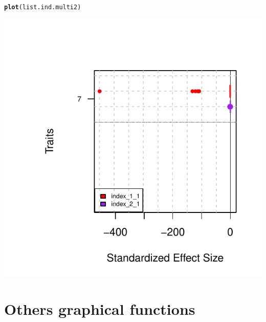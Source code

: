\documentclass[12pt]{article}\usepackage[]{graphicx}\usepackage[]{color}
\makeatletter
\def\maxwidth{ %
  \ifdim\Gin@nat@width>\linewidth
    \linewidth
  \else
    \Gin@nat@width
  \fi
}
\newcommand{\hlstd}[1]{\textcolor[rgb]{0.345,0.345,0.345}{#1}}%
\newcommand{\hlkwd}[1]{\textcolor[rgb]{0.737,0.353,0.396}{\textbf{#1}}}%
\newenvironment{kframe}{%
 \def\at@end@of@kframe{}%
 \ifinner\ifhmode%
  \def\at@end@of@kframe{\end{minipage}}%
  \begin{minipage}{\columnwidth}%
 \fi\fi%
 \def\FrameCommand##1{\hskip\@totalleftmargin \hskip-\fboxsep
 \colorbox{shadecolor}{##1}\hskip-\fboxsep
     \hskip-\linewidth \hskip-\@totalleftmargin \hskip\columnwidth}%
 \MakeFramed {\advance\hsize-\width
   \@totalleftmargin\z@ \linewidth\hsize
   \@setminipage}}%
 {\par\unskip\endMakeFramed%
 \at@end@of@kframe}
\newenvironment{knitrout}{}{} %
\makeatother
\begin{document}
\begin{knitrout}
\color{fgcolor}\begin{kframe}
\begin{alltt}
\hlkwd{plot}\hlstd{(list.ind.multi2)}
\end{alltt}
\end{kframe}
\includegraphics[width=\maxwidth]{figure/unnamed-chunk-61} 

\end{knitrout}

\section{Others graphical functions}
\end{document}
